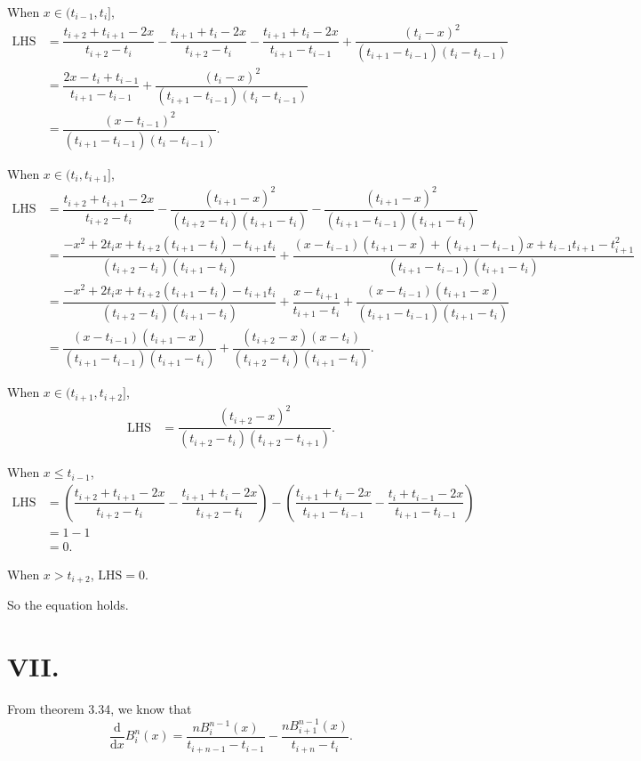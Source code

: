 \documentclass[a4paper]{article}
\begin{document}
When $x\in (t_{i-1},t_{i}]$, 
$$
\begin{aligned}
  \text{LHS}&=\dfrac{t_{i+2}+t_{i+1}-2x}{t_{i+2}-t_{i}}-\dfrac{t_{i+1}+t_{i}-2x}{t_{i+2}-t_{i}}-\dfrac{t_{i+1}+t_{i}-2x}{t_{i+1}-t_{i-1}}+\dfrac{(t_{i}-x)^{2}}{(t_{i+1}-t_{i-1})(t_{i}-t_{i-1})}\\
  &=\dfrac{2x-t_{i}+t_{i-1}}{t_{i+1}-t_{i-1}}+\dfrac{(t_{i}-x)^{2}}{(t_{i+1}-t_{i-1})(t_{i}-t_{i-1})}\\
  &=\dfrac{(x-t_{i-1})^2}{(t_{i+1}-t_{i-1})(t_i-t_{i-1})}.
\end{aligned}
$$

When $x\in (t_{i},t_{i+1}]$, 
$$
\begin{aligned}
  \text{LHS}&=\dfrac{t_{i+2}+t_{i+1}-2x}{t_{i+2}-t_{i}}-\dfrac{(t_{i+1}-x)^{2}}{(t_{i+2}-t_{i})(t_{i+1}-t_{i})}-\dfrac{(t_{i+1}-x)^{2}}{(t_{i+1}-t_{i-1})(t_{i+1}-t_{i})}\\
  &=\dfrac{-x^2+2t_{i}x+t_{i+2}(t_{i+1}-t_{i})-t_{i+1}t_i}{(t_{i+2}-t_i)(t_{i+1}-t_i)}+\dfrac{(x-t_{i-1})(t_{i+1}-x)+(t_{i+1}-t_{i-1})x+t_{i-1}t_{i+1}-t_{i+1}^2}{(t_{i+1}-t_{i-1})(t_{i+1}-t_i)}\\
  &=\dfrac{-x^2+2t_{i}x+t_{i+2}(t_{i+1}-t_{i})-t_{i+1}t_i}{(t_{i+2}-t_i)(t_{i+1}-t_i)}+\dfrac{x-t_{i+1}}{t_{i+1}-t_i}+\dfrac{(x-t_{i-1})(t_{i+1}-x)}{(t_{i+1}-t_{i-1})(t_{i+1}-t_i)}\\
  &=\dfrac{(x-t_{i-1})(t_{i+1}-x)}{(t_{i+1}-t_{i-1})(t_{i+1}-t_i)}+\dfrac{(t_{i+2}-x)(x-t_i)}{(t_{i+2}-t_i)(t_{i+1}-t_i)}.
\end{aligned}
$$

When $x\in (t_{i+1},t_{i+2}]$, 
$$
\begin{aligned}
  \text{LHS}&=\dfrac{(t_{i+2}-x)^{2}}{(t_{i+2}-t_{i})(t_{i+2}-t_{i+1})}.
\end{aligned}
$$

When $x\leq t_{i-1}$, 
$$
\begin{aligned}
  \text{LHS}&=(\dfrac{t_{i+2}+t_{i+1}-2x}{t_{i+2}-t_{i}}-\dfrac{t_{i+1}+t_{i}-2x}{t_{i+2}-t_{i}})-(\dfrac{t_{i+1}+t_{i}-2x}{t_{i+1}-t_{i-1}}-\dfrac{t_{i}+t_{i-1}-2x}{t_{i+1}-t_{i-1}})\\
  &=1-1\\
  &=0.
\end{aligned}
$$

When $x>t_{i+2}$, $\text{LHS}=0$.

So the equation holds.

\section*{VII.}
From theorem 3.34, we know that 
$$
\frac{\mathrm{d}}{\mathrm{d}x}B_i^n(x)=\frac{nB_i^{n-1}(x)}{t_{i+n-1}-t_{i-1}}-\frac{nB_{i+1}^{n-1}(x)}{t_{i+n}-t_i}.
$$
\end{document}
